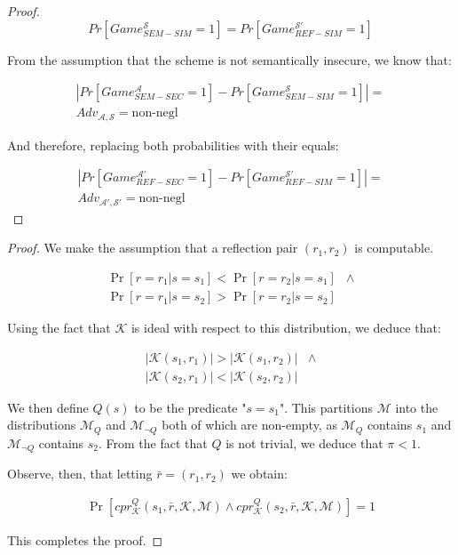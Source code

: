 \begin{proof}
    \begin{equation}
        Pr[Game_{SEM-SIM}^{\mathcal{S}} = 1] = Pr[Game_{REF-SIM}^{\mathcal{S'}} = 1]
    \end{equation}

    From the assumption that the scheme is not semantically insecure, we know
    that:

    \begin{align*}
        |Pr[Game_{SEM-SEC}^{\mathcal{A}} = 1] - Pr[Game_{SEM-SIM}^{\mathcal{S}} = 1]| =\\
        Adv_{\mathcal{A}, \mathcal{S}} = \text{non-negl}
    \end{align*}

    And therefore, replacing both probabilities with their equals:

    \begin{align*}
        |Pr[Game_{REF-SEC}^{\mathcal{A'}} = 1] -
        Pr[Game_{REF-SIM}^{\mathcal{S'}} = 1]| =\\
        Adv_{\mathcal{A'}, \mathcal{S'}} = \text{non-negl}
    \end{align*}
\end{proof}

\begin{lemma}
\end{lemma}

\begin{proof}

We make the assumption that a reflection pair $(r_1, r_2)$ is computable.

\begin{align*}
    \Pr[r = r_1|s = s_1] < \Pr[r = r_2|s = s_1]&\land\\
    \Pr[r = r_1|s = s_2] > \Pr[r = r_2|s = s_2]&
\end{align*}

Using the fact that $\mathcal{K}$ is ideal with respect to this distribution,
we deduce that:

\begin{align*}
    |\mathcal{K}(s_1, r_1)| > |\mathcal{K}(s_1, r_2)|&\land\\
    |\mathcal{K}(s_2, r_1)| < |\mathcal{K}(s_2, r_2)|&
\end{align*}

We then define $Q(s)$ to be the predicate "$s = s_1$". This partitions
$\mathcal{M}$ into the distributions $\mathcal{M}_Q$ and
$\mathcal{M}_{\lnot Q}$ both of which are non-empty, as $\mathcal{M}_Q$
contains $s_1$ and $\mathcal{M}_{\lnot Q}$ contains $s_2$. From the fact that
$Q$ is not trivial, we deduce that $\pi < 1$.

Observe, then, that letting $\bar{r} = (r_1, r_2)$ we obtain:

\begin{align*}
    \Pr[cpr^Q_{\mathcal{K}}(s_1, \bar{r}, \mathcal{K}, \mathcal{M})
    \land
    cpr^Q_{\mathcal{K}}(s_2, \bar{r}, \mathcal{K}, \mathcal{M})] = 1
\end{align*}

This completes the proof.

\end{proof}

